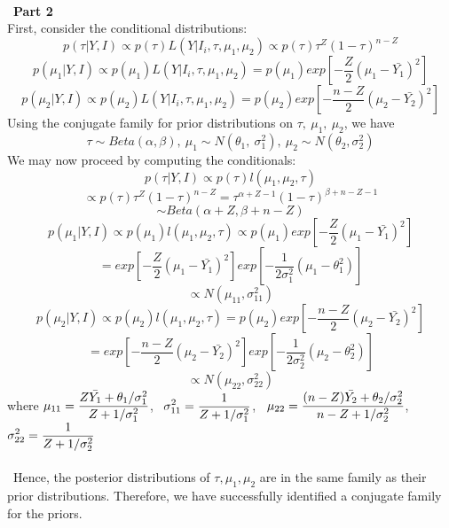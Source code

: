 \documentclass[10pt,a4paper]{article}
\begin{document}
\text{}
\\\
\textbf{Part 2}\\
First, consider the conditional distributions:\\
$$p(\tau|Y,I) \propto p(\tau)L(Y \vert I_i, \tau, \mu_1,\mu_2)\propto p(\tau) \tau^{Z}(1-\tau)^{n-Z}$$
$$p(\mu_{1}|Y,I)\propto p(\mu_{1})L(Y \vert I_i, \tau, \mu_1,\mu_2)
=p(\mu_{1})exp[-\frac{Z}{2}(\mu_{1}-\bar{Y_{1}})^2]$$
$$p(\mu_{2}|Y,I)\propto p(\mu_{2})L(Y \vert I_i, \tau, \mu_1,\mu_2)
=p(\mu_{2})exp[-\frac{n-Z}{2}(\mu_{2}-\bar{Y_{2}})^2]$$
Using the conjugate family for prior distributions on $\tau,\ \mu_{1},\ \mu_{2}$, we have
$$\tau \sim Beta(\alpha,\beta), \  \mu_{1} \sim N(\theta_{1}, \ \sigma_{1}^{2}),  \ \mu_{2} \sim  N(\theta_{2},\sigma_{2}^{2})$$ 
We may now proceed by computing the conditionals:
$$p(\tau|Y,I) \propto p(\tau)l(\mu_{1},\mu_{2},\tau)$$
$$\propto p(\tau) \tau^{Z}(1-\tau)^{n-Z}
=\tau^{\alpha+Z-1}(1-\tau)^{\beta+n-Z-1}$$
$$\sim Beta(\alpha+Z,\beta+n-Z)$$
$$p(\mu_{1}|Y,I) \propto p(\mu_{1})l(\mu_{1},\mu_{2},\tau)\propto p(\mu_{1})exp[-\frac{Z}{2}(\mu_{1}-\bar{Y_{1}})^2]$$
$$=exp[-\frac{Z}{2}(\mu_{1}-\bar{Y_{1}})^2] exp[-\frac{1}{2\sigma_{1}^{2}}(\mu_{1}-\theta_{1}^{2})]$$
$$\propto N(\mu_{11},\sigma_{11}^{2})$$
$$p(\mu_{2}|Y,I) \propto p(\mu_{2})l(\mu_{1},\mu_{2},\tau)=p(\mu_{2})exp[-\frac{n-Z}{2}(\mu_{2}-\bar{Y_{2}})^2]$$
$$=exp[-\frac{n-Z}{2}(\mu_{2}-\bar{Y_{2}})^2] exp[-\frac{1}{2\sigma_{2}^{2}}(\mu_{2}-\theta_{2}^{2})]$$
$$\propto N(\mu_{22},\sigma_{22}^{2})$$
where $\mathlarger{\mu_{11}=\frac{Z\bar{Y_{1}}+\theta_{1}/\sigma_{1}^{2}}{Z+1/\sigma_{1}^{2}}}$, \  $\mathlarger{\sigma_{11}^{2}=\frac{1}{Z+1/\sigma_{1}^{2}}}$, \ $\mathlarger{\mu_{22}=\frac{(n-Z)\bar{Y_{2}}+\theta_{2}/\sigma_{2}^{2}}{n-Z+1/\sigma_{2}^{2}}}$, \ $\mathlarger{\sigma_{22}^{2}=\frac{1}{Z+1/\sigma_{2}^{2}}}$\\
\\\
Hence, the posterior distributions of $\tau, \mu_{1}, \mu_{2}$ are in the same family as their prior distributions. Therefore, we have successfully identified a conjugate family for the priors. 
\end{document}

